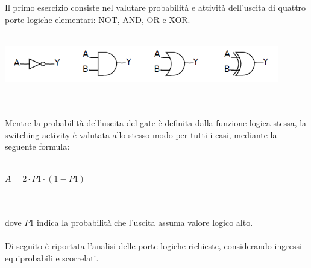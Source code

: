 \documentclass[11pt,  english, makeidx, a4paper, titlepage, oneside]{book}
\begin{document}
Il primo esercizio consiste nel valutare probabilità e attività dell'uscita di 
quattro porte logiche elementari: NOT, AND, OR e XOR.
\\\\
\centerline{\includegraphics[width=12cm]{./img/Lab_1/Es_1/Porte.png}}
\\\\
Mentre la probabilità dell'uscita del gate è definita dalla funzione logica
stessa, la switching activity è valutata allo stesso modo per tutti i casi, 
mediante la seguente formula:
\\\\
	\centerline{$A = 2 \cdot P1 \cdot (1-P1)$}
\\\\
dove $P1$ indica la probabilità che l'uscita assuma valore logico alto.\\\\
Di seguito è riportata l'analisi delle porte logiche richieste, considerando 
ingressi equiprobabili e scorrelati.
\end{document}

